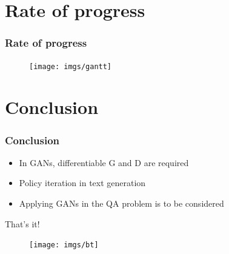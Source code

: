 \documentclass{beamer}
\begin{document}
\section{Rate of progress}
\begin{frame}
\frametitle{Rate of progress}
\begin{figure}
\centering
\texttt{[image: imgs/gantt]}
\end{figure}
\end{frame}

\section{Conclusion}
\begin{frame}
\frametitle{Conclusion}
\begin{itemize}
\item In GANs, differentiable G and D are required
\item Policy iteration in text generation
\item Applying GANs in the QA problem is to be considered
\end{itemize}
\end{frame}




\begin{frame}
\vspace{3cm}
\Huge{\centerline{That's it!}}
\begin{figure}
\hspace{-7cm}
\texttt{[image: imgs/bt]}
\end{figure}
\end{frame}
\end{document}
